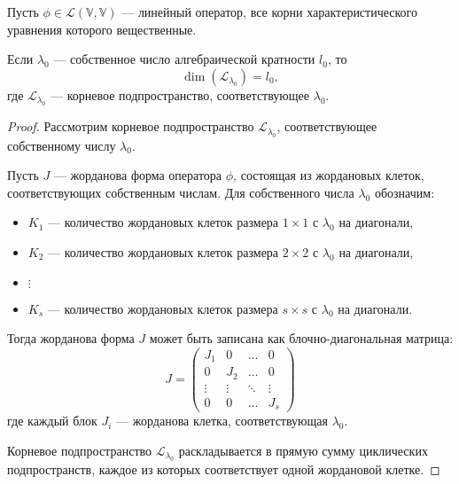 \begin{shth}
    \begin{theorem}
        \leavevmode \nl 
        
Пусть $\phi \in \mathcal{L}(\mathbb{V}, \mathbb{V})$ — линейный оператор, все корни характеристического \\уравнения которого вещественные. 

    Если $\lambda_{0}$ — собственное число алгебраической кратности $l_{0}$, то 
    \[
        \dim(\mathcal{L}_{\lambda_{0}}) = l_{0},
    \]
    где $\mathcal{L}_{\lambda_{0}}$ — корневое подпространство, соответствующее $\lambda_{0}$.
    \end{theorem}
\end{shth}



\begin{proof}
Рассмотрим корневое подпространство $\mathcal{L}_{\lambda_{0}}$, соответствующее \\собственному числу $\lambda_{0}$.

Пусть $J$ — жорданова форма оператора $\phi$, состоящая из жордановых клеток, \\соответствующих собственным числам. Для собственного числа $\lambda_{0}$ обозначим:

\begin{itemize}
    \item $K_{1}$ — количество жордановых клеток размера $1 \times 1$ с $\lambda_{0}$ на диагонали,
    \item $K_{2}$ — количество жордановых клеток размера $2 \times 2$ с $\lambda_{0}$ на диагонали,
    \item $\vdots$
    \item $K_{s}$ — количество жордановых клеток размера $s \times s$ с $\lambda_{0}$ на диагонали.
\end{itemize}

Тогда жорданова форма $J$ может быть записана как блочно-диагональная матрица:
\[
J = \begin{pmatrix}
J_{1} & 0 & \ldots & 0 \\
0 & J_{2} & \ldots & 0 \\
\vdots & \vdots & \ddots & \vdots \\
0 & 0 & \ldots & J_{s}
\end{pmatrix}
\]
где каждый блок $J_{i}$ — жорданова клетка, соответствующая $\lambda_{0}$.

Корневое подпространство $\mathcal{L}_{\lambda_{0}}$ раскладывается в прямую сумму циклических \\подпространств, каждое из которых соответствует одной жордановой клетке. 


\end{proof}
